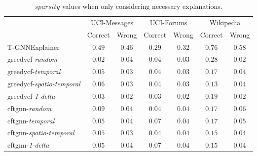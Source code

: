 \begin{table}[ht]
    \centering
    \small
    \begin{tabular}{lcccccc}
    \hline
         &  \multicolumn{2}{c}{UCI-Messages}&  \multicolumn{2}{c}{UCI-Forums}&  \multicolumn{2}{c}{Wikipedia}\\
         &  Correct&  Wrong&  Correct&  Wrong&  Correct& Wrong\\
         \hline
         T-GNNExplainer&  $0.49$&  $0.46$&  $0.29$&  $0.32$&  $0.76$& $0.58$\\
         \gls{greedycf}-\textit{random}&  $0.02$&  $0.04$&  $0.04$&  $0.03$&  $0.28$& $0.02$\\
         \gls{greedycf}-\textit{temporal}&  $0.05$&  $0.03$&  $0.04$&  $0.03$&  $0.17$& $0.04$\\
         \gls{greedycf}-\textit{spatio-temporal}&  $0.06$&  $0.03$&  $0.04$&  $0.03$&  $0.13$& $0.04$\\
         \gls{greedycf}-\textit{1-delta}&  $0.03$&  $0.02$&  $0.03$&  $0.02$&  $0.19$& $0.02$\\
         \gls{cftgnn}-\textit{random}&  $0.09$&  $0.04$&  $0.04$&  $0.04$&  $0.17$& $0.06$\\
         \gls{cftgnn}-\textit{temporal}&  $0.05$&  $0.04$&  $0.07$&  $0.04$&  $0.17$& $0.05$\\
         \gls{cftgnn}-\textit{spatio-temporal}&  $0.05$&  $0.03$&  $0.04$&  $0.04$&  $0.15$& $0.04$\\
 \gls{cftgnn}-\textit{1-delta}& $0.05$& $0.04$& $0.07$& $0.04$& $0.15$&$0.04$\\
 \hline
    \end{tabular}
    \caption{$sparsity$ values when only considering necessary explanations.}
    \label{t_spar_nec}
\end{table}


